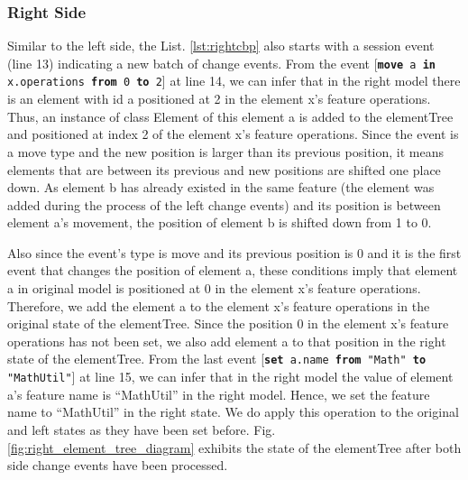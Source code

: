 \documentclass{jot}
\begin{document}
\subsubsection{Right Side}\label{sec:right_side}  Similar to the left side, the List. \ref{lst:rightcbp} also starts with a \textsf{session} event (line 13) indicating a new batch of change events. From the event [\texttt{\small \textbf{move} a \textbf{in} x.operations \textbf{from} 0 \textbf{to} 2}] at line 14, we can infer that in the right model there is an element with id \textsf{a} positioned at 2 in the element \textsf{x}'s feature \textsf{operations}. Thus, an instance of class \textsf{Element} of this element \textsf{a} is added to the \textsf{elementTree} and positioned at index 2 of the element \textsf{x}'s feature \textsf{operations}. Since the event is a \textsf{move} type and the new position is larger than its previous position, it means elements that are between its previous and new positions are shifted one place down. As element \textsf{b} has already existed in the same feature (the element was added during the process of the left change events) and its position is between element \textsf{a}'s movement, the position of element \textsf{b} is shifted down from 1 to 0. 

Also since the event's type is \textsf{move} and its previous position is 0 and it is the first event that changes the position of element \textsf{a}, these conditions imply that element \textsf{a} in original model is positioned at 0 in the element \textsf{x}'s feature \textsf{operations}. Therefore, we add the element \textsf{a} to  the element \textsf{x}'s feature \textsf{operations} in the original state of the \textsf{elementTree}. Since the position 0 in the element \textsf{x}'s feature \textsf{operations} has not been set, we also add element \textsf{a} to that position in the right state of the \textsf{elementTree}. From the last event [\texttt{\small \textbf{set} a.name \textbf{from} "Math" \textbf{to} "MathUtil"}] at line 15, we can infer that in the right model the value of element \textsf{a}'s feature \textsf{name} is ``MathUtil'' in the right model. Hence, we set the feature \textsf{name} to ``MathUtil'' in the right state. We do apply this operation to the original and left states as they have been set before. Fig. \ref{fig:right_element_tree_diagram} exhibits the state of the \textsf{elementTree} after both side change events have been processed.
\end{document}
